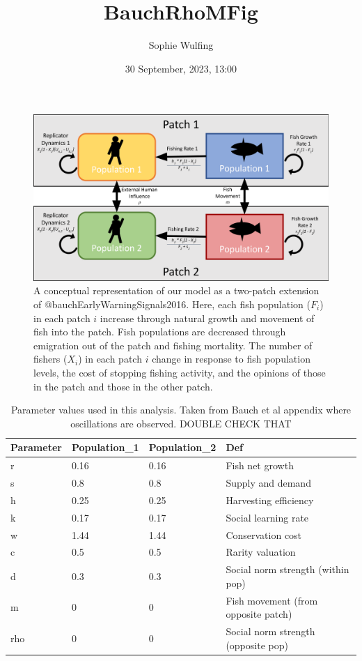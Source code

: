 \documentclass[
]{article}
\title{BauchRhoMFig}
\author{Sophie Wulfing}
\date{30 September, 2023, 13:00}
\begin{document}
\maketitle

\begin{figure}
\includegraphics[width=1\linewidth]{CoupledModelConceptual} \caption{A conceptual representation of our model as a two-patch extension of @bauchEarlyWarningSignals2016. Here, each fish population (\(F_i\)) in each patch \(i\) increase through natural growth and movement of fish into the patch. Fish populations are decreased through emigration out of the patch and fishing mortality. The number of fishers (\(X_i\)) in each patch \(i\) change in response to fish population levels, the cost of stopping fishing activity, and the opinions of those in the patch and those in the other patch. \label{Conceptual}}\label{fig:Conceptual}
\end{figure}



\begin{table}

\caption{\label{tab:paramtable}Parameter values used in this analysis. Taken from Bauch et al appendix where oscillations are observed. DOUBLE CHECK THAT}
\centering
\begin{tabular}[t]{llll}
\toprule
Parameter & Population\_1 & Population\_2 & Def\\
\midrule
r & 0.16 & 0.16 & Fish net growth\\
s & 0.8 & 0.8 & Supply and demand\\
h & 0.25 & 0.25 & Harvesting efficiency\\
k & 0.17 & 0.17 & Social learning rate\\
w & 1.44 & 1.44 & Conservation cost\\
\addlinespace
c & 0.5 & 0.5 & Rarity valuation\\
d & 0.3 & 0.3 & Social norm strength (within pop)\\
m & 0 & 0 & Fish movement (from opposite patch)\\
rho & 0 & 0 & Social norm strength (opposite pop)\\
\bottomrule
\end{tabular}
\end{table}
\end{document}
